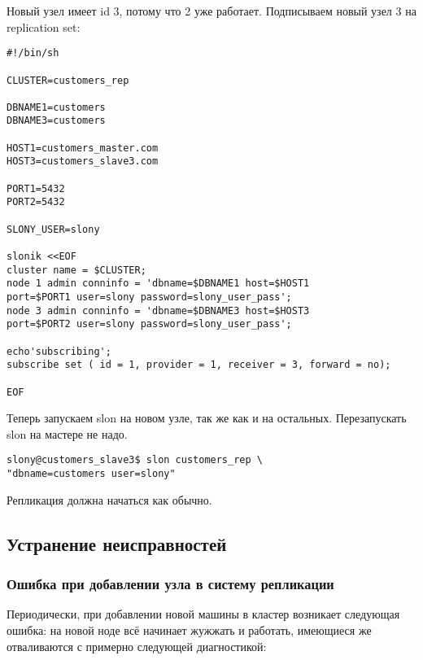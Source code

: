 Новый узел имеет id 3, потому что 2 уже работает. Подписываем новый узел 3 на replication set:

\begin{lstlisting}[label=lst:slony15,caption=Общие задачи]
#!/bin/sh

CLUSTER=customers_rep

DBNAME1=customers
DBNAME3=customers

HOST1=customers_master.com
HOST3=customers_slave3.com

PORT1=5432
PORT2=5432

SLONY_USER=slony

slonik <<EOF
cluster name = $CLUSTER;
node 1 admin conninfo = 'dbname=$DBNAME1 host=$HOST1
port=$PORT1 user=slony password=slony_user_pass';
node 3 admin conninfo = 'dbname=$DBNAME3 host=$HOST3
port=$PORT2 user=slony password=slony_user_pass';

echo'subscribing';
subscribe set ( id = 1, provider = 1, receiver = 3, forward = no);

EOF
\end{lstlisting}

Теперь запускаем slon на новом узле, так же как и на остальных. Перезапускать slon на мастере не надо.

\begin{lstlisting}[label=lst:slony16,caption=Общие задачи]
slony@customers_slave3$ slon customers_rep \
"dbname=customers user=slony"
\end{lstlisting}

Репликация должна начаться как обычно.

\subsection{Устранение неисправностей}

\subsubsection{Ошибка при добавлении узла в систему репликации}

Периодически, при добавлении новой машины в кластер возникает следующая ошибка: на новой ноде всё начинает жужжать и работать, имеющиеся же отваливаются с примерно следующей диагностикой:

